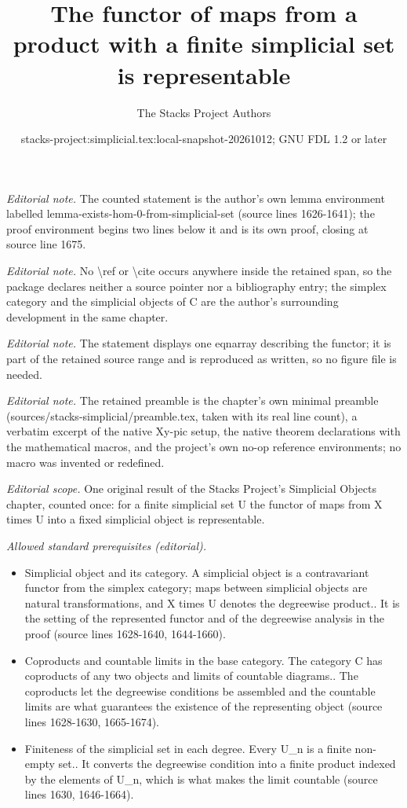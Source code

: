 \documentclass{stacks-project}
\title{The functor of maps from a product with a finite simplicial set is representable}
\author{The Stacks Project Authors}
\date{stacks-project:simplicial.tex:local-snapshot-20261012; GNU FDL 1.2 or later}
\theoremstyle{plain}
\theoremstyle{definition}
\theoremstyle{remark}
\numberwithin{equation}{subsection}
\begin{document}
\maketitle
\noindent\textit{Editorial note.} The counted statement is the author's own lemma environment labelled lemma-exists-hom-0-from-simplicial-set (source lines 1626-1641); the proof environment begins two lines below it and is its own proof, closing at source line 1675.\par\medskip
\noindent\textit{Editorial note.} No \textbackslash{}ref or \textbackslash{}cite occurs anywhere inside the retained span, so the package declares neither a source pointer nor a bibliography entry; the simplex category and the simplicial objects of C are the author's surrounding development in the same chapter.\par\medskip
\noindent\textit{Editorial note.} The statement displays one eqnarray describing the functor; it is part of the retained source range and is reproduced as written, so no figure file is needed.\par\medskip
\noindent\textit{Editorial note.} The retained preamble is the chapter's own minimal preamble (sources/stacks-simplicial/preamble.tex, taken with its real line count), a verbatim excerpt of the native Xy-pic setup, the native theorem declarations with the mathematical macros, and the project's own no-op reference environments; no macro was invented or redefined.\par\medskip
\noindent\textit{Editorial scope.} One original result of the Stacks Project's Simplicial Objects chapter, counted once: for a finite simplicial set U the functor of maps from X times U into a fixed simplicial object is representable.\par\medskip
\noindent\textit{Allowed standard prerequisites (editorial).}\begin{itemize}
\item Simplicial object and its category. A simplicial object is a contravariant functor from the simplex category; maps between simplicial objects are natural transformations, and X times U denotes the degreewise product.. It is the setting of the represented functor and of the degreewise analysis in the proof (source lines 1628-1640, 1644-1660).
\item Coproducts and countable limits in the base category. The category C has coproducts of any two objects and limits of countable diagrams.. The coproducts let the degreewise conditions be assembled and the countable limits are what guarantees the existence of the representing object (source lines 1628-1630, 1665-1674).
\item Finiteness of the simplicial set in each degree. Every U\_n is a finite non-empty set.. It converts the degreewise condition into a finite product indexed by the elements of U\_n, which is what makes the limit countable (source lines 1630, 1646-1664).
\end{itemize}\medskip
\end{document}
